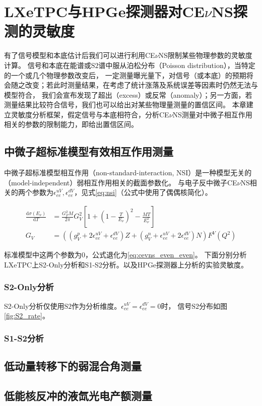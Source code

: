 
\chapter{LXeTPC与HPGe探测器对CE$\nu$NS探测的灵敏度}
\label{sec:sensitivity}

有了信号模型和本底估计后我们可以进行利用CE$\nu$NS限制某些物理参数的灵敏度计算。
信号和本底在能谱或$\mathrm{S2}$谱中服从泊松分布（Poisson distribution），当特定的一个或几个物理参数改变后，
一定测量曝光量下，对信号（或本底）的预期将会随之改变；若此时测量结果，在考虑了统计涨落及系统误差等因素时仍然无法与模型符合，
我们会宣布发现了超出（excess）或反常（anomaly）；另一方面，若测量结果比较符合信号，我们也可以给出对某些物理量测量的置信区间。
本章建立灵敏度分析框架，假定信号与本底相符合，分析CE$\nu$NS测量对中微子相互作用相关的参数的限制能力，即给出置信区间。

\section{中微子超标准模型有效相互作用测量}

中微子超标准模型相互作用（non-standard-interaction, NSI）是一种模型无关的（model-independent）弱相互作用相关的截面参数化\cite{barranco_probing_2005}。
与电子反中微子CE$\nu$NS相关的两个参数为$\epsilon_{ee}^{uV},\epsilon_{ee}^{dV}$，见式\ref{eq:nsi}（公式中使用了偶偶核简化）。

\begin{align}
    \label{eq:nsi}
    \frac{\mathrm{d}\sigma(E_\nu)}{\mathrm{d}T} &= \frac{G_F^2 M}{2\pi}G_V^2\left[1+(1-\frac{T}{E_{\nu}})^2-\frac{MT}{E_{\nu}^2}\right] \\
    G_V &= ((g_V^p+2\epsilon_{ee}^{uV}+\epsilon_{ee}^{dV})Z+(g_V^n+\epsilon_{ee}^{uV}+2\epsilon_{ee}^{dV})N)F^V(Q^2)
\end{align}

标准模型中这两个参数为0，公式退化为\ref{eq:cevns_even_even}。
下面分别分析LXeTPC上S2-Only分析和S1-S2分析。以及HPGe探测器上分析的实验灵敏度。

\subsection{S2-Only分析}

S2-Only分析仅使用$\mathrm{S2}$作为分析维度。$\epsilon_{ee}^{uV}=\epsilon_{ee}^{dV}=0$时，
信号$\mathrm{S2}$分布如图\ref{fig:S2_rate}。



\subsection{S1-S2分析}

\section{低动量转移下的弱混合角测量}

\section{低能核反冲的液氙光电产额测量}
